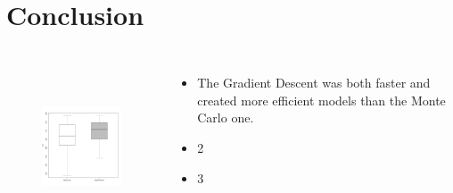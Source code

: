 \documentclass[presentation]{beamer}   %
\begin{document}
\section{Conclusion}
\begin{frame}
  \begin{columns}[t] %
		\begin{figure}
		\centering
			\includegraphics[width=50mm,height=50mm]{fig/boxplot.pdf}
		\end{figure}
		\centering
		\begin{itemize}
			\item The Gradient Descent was both faster and created more efficient models than the Monte Carlo one.
			\item 2 
			\item 3
			\end{itemize}
  \end{columns}
\end{frame}
\end{document}
